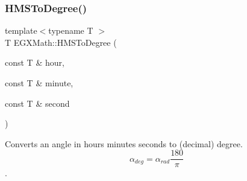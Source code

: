\mbox{\label{group___e_g_x_math-_angle_conversions-_h_m_s_ga281ee88be0cb04f58bdf19efcef58146}} 
\subsubsection{\texorpdfstring{H\+M\+S\+To\+Degree()}{HMSToDegree()}}
{\footnotesize\ttfamily template$<$typename T $>$ \\
T E\+G\+X\+Math\+::\+H\+M\+S\+To\+Degree (\begin{DoxyParamCaption}\item[{const T \&}]{hour,  }\item[{const T \&}]{minute,  }\item[{const T \&}]{second }\end{DoxyParamCaption})}



Converts an angle in hours minutes seconds to (decimal) degree. \[\alpha_{deg}=\alpha_{rad}\frac{180}{\pi}\]. 

